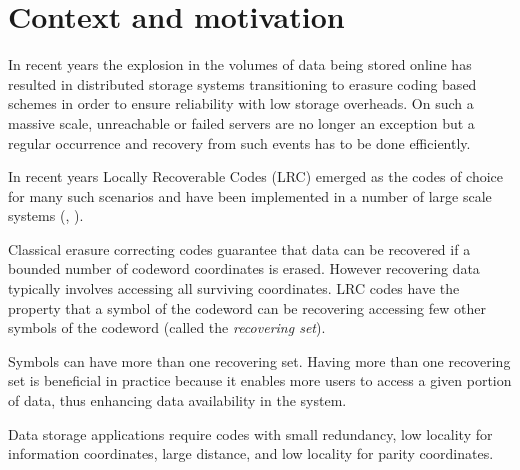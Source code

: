 \chapter{Context and motivation}

In recent years the explosion in the volumes of data being stored online has resulted in distributed storage systems transitioning to erasure coding based schemes in order to ensure reliability with low storage overheads. On such a massive scale, unreachable or failed servers are no longer an exception but a regular occurrence and recovery from such events has to be done efficiently.

In recent years Locally Recoverable Codes (LRC) emerged as the codes of choice for many such scenarios and have been implemented in a number of large scale systems (\cite{azure}, \cite{hadoop}).

Classical erasure correcting codes guarantee that data can be recovered if a bounded number of codeword coordinates is erased. However recovering data typically involves accessing all surviving coordinates. LRC codes have the property that a symbol of the codeword can be recovering accessing few other symbols of the codeword (called the \textit{recovering set}).

Symbols can have more than one recovering set. Having more than one recovering set is beneficial in practice because it enables more users to access a given portion of data, thus enhancing data availability in the system.

Data storage applications require codes with small redundancy, low locality for information coordinates, large distance, and low locality for parity coordinates.